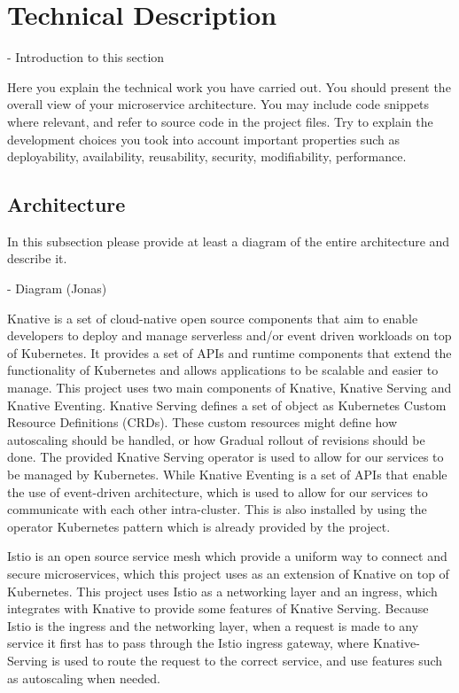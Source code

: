 \documentclass[a4paper,12pt]{article}
\begin{document}
\section{Technical Description}

- Introduction to this section

Here you explain the technical work you have carried out. You should present the
overall view of your microservice architecture. You may include code
snippets where relevant, and refer to source code in the project files. Try to
explain the development choices you took into account important properties
such as deployability, availability, reusability, security, modifiability,
performance.

\subsection{Architecture}

In this subsection please provide at least a diagram of the entire 
architecture and describe it.

- Diagram (Jonas)


Knative \cite{knative} is a set of cloud-native open source components that aim to enable developers to deploy and manage serverless and/or event driven workloads on top of Kubernetes.
It provides a set of APIs and runtime components that extend the functionality of Kubernetes and allows applications to be scalable and easier to manage.
This project uses two main components of Knative, Knative Serving and Knative Eventing. Knative Serving defines a set of object as Kubernetes Custom Resource Definitions (CRDs).
These custom resources might define how autoscaling should be handled, or how Gradual rollout of revisions should be done.
The provided Knative Serving operator is used to allow for our services to be managed by Kubernetes.
While Knative Eventing is a set of APIs that enable the use of event-driven architecture, which is used to allow for our services to communicate with each other intra-cluster.
This is also installed by using the operator Kubernetes pattern which is already provided by the project.

\medskip

Istio \cite{istio} is an open source service mesh which provide a uniform way to connect and secure microservices,
which this project uses as an extension of Knative on top of Kubernetes.
This project uses Istio as a networking layer and an ingress, which integrates with Knative to provide some features of Knative Serving.
Because Istio is the ingress and the networking layer, when a request is made to any service it first has to pass through the Istio ingress gateway,
where Knative-Serving is used to route the request to the correct service, and use features such as autoscaling when needed.
\end{document}
